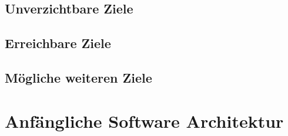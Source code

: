 \subsection{Unverzichtbare Ziele}

\subsection{Erreichbare Ziele}

\subsection{Mögliche weiteren Ziele}

\section{Anfängliche Software Architektur}
